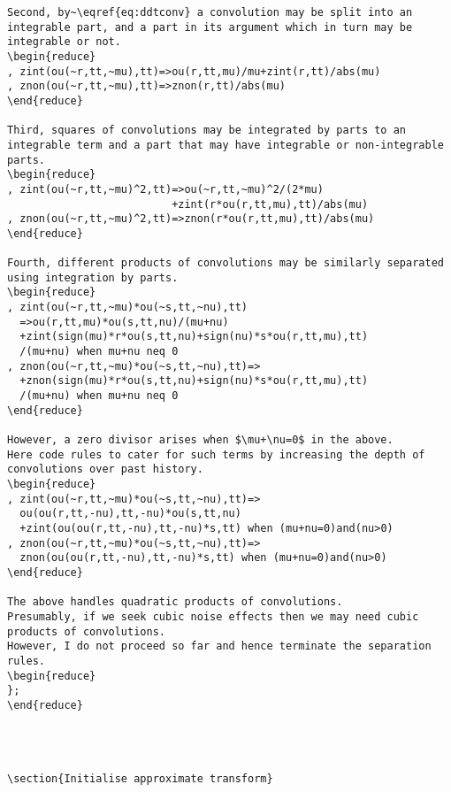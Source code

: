 \documentclass[11pt,a5paper]{article}
\begin{document}
\begin{reduce}
\begin{verbatim}
Second, by~\eqref{eq:ddtconv} a convolution may be split into an integrable part, and a part in its argument which in turn may be integrable or not.
\begin{reduce}
, zint(ou(~r,tt,~mu),tt)=>ou(r,tt,mu)/mu+zint(r,tt)/abs(mu)
, znon(ou(~r,tt,~mu),tt)=>znon(r,tt)/abs(mu)
\end{reduce}

Third, squares of convolutions may be integrated by parts to an integrable term and a part that may have integrable or non-integrable parts.
\begin{reduce}
, zint(ou(~r,tt,~mu)^2,tt)=>ou(~r,tt,~mu)^2/(2*mu)
                          +zint(r*ou(r,tt,mu),tt)/abs(mu)
, znon(ou(~r,tt,~mu)^2,tt)=>znon(r*ou(r,tt,mu),tt)/abs(mu)
\end{reduce}

Fourth, different products of convolutions may be similarly separated using integration by parts.  
\begin{reduce}
, zint(ou(~r,tt,~mu)*ou(~s,tt,~nu),tt)
  =>ou(r,tt,mu)*ou(s,tt,nu)/(mu+nu)
  +zint(sign(mu)*r*ou(s,tt,nu)+sign(nu)*s*ou(r,tt,mu),tt)
  /(mu+nu) when mu+nu neq 0
, znon(ou(~r,tt,~mu)*ou(~s,tt,~nu),tt)=>
  +znon(sign(mu)*r*ou(s,tt,nu)+sign(nu)*s*ou(r,tt,mu),tt)
  /(mu+nu) when mu+nu neq 0
\end{reduce}

However, a zero divisor arises when $\mu+\nu=0$ in the above.
Here code rules to cater for such terms by increasing the depth of convolutions over past history.
\begin{reduce}
, zint(ou(~r,tt,~mu)*ou(~s,tt,~nu),tt)=>
  ou(ou(r,tt,-nu),tt,-nu)*ou(s,tt,nu)
  +zint(ou(ou(r,tt,-nu),tt,-nu)*s,tt) when (mu+nu=0)and(nu>0)
, znon(ou(~r,tt,~mu)*ou(~s,tt,~nu),tt)=>
  znon(ou(ou(r,tt,-nu),tt,-nu)*s,tt) when (mu+nu=0)and(nu>0)
\end{reduce}

The above handles quadratic products of convolutions.
Presumably, if we seek cubic noise effects then we may need cubic products of convolutions.
However, I do not proceed so far and hence terminate the separation rules.
\begin{reduce}
};
\end{reduce}




\section{Initialise approximate transform}


\end{verbatim}
\end{reduce}
\end{document}
